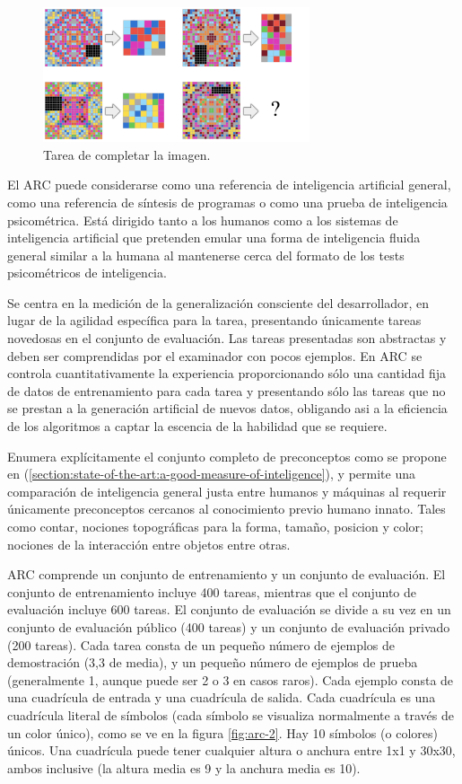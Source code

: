 \begin{figure}[ht!]
    \centering
    \includegraphics[width=0.7\textwidth]{Graphics/arc-3.png}
    \caption{Tarea de completar la imagen.}
    \label{fig:arc-3}
\end{figure}


El ARC puede considerarse como una referencia de inteligencia artificial general, como una referencia de síntesis de programas o como una prueba de inteligencia psicométrica. Está dirigido tanto a los humanos como a los sistemas de inteligencia artificial que pretenden emular una forma de inteligencia fluida general similar a la humana al mantenerse cerca del formato de los tests psicométricos de inteligencia. 

Se centra en la medición de la generalización consciente del desarrollador, en lugar de la agilidad específica para la tarea, presentando únicamente tareas novedosas en el conjunto de evaluación. Las tareas presentadas son abstractas y deben ser comprendidas por el examinador con pocos ejemplos. En ARC se controla cuantitativamente la experiencia proporcionando sólo una cantidad fija de datos de entrenamiento para cada tarea y presentando sólo las tareas que no se prestan a la generación artificial de nuevos datos, obligando asi a la eficiencia de los algoritmos a captar la escencia de la habilidad que se requiere.

Enumera explícitamente el conjunto completo de preconceptos como se propone en (\ref{section:state-of-the-art:a-good-measure-of-inteligence}), y permite una comparación de inteligencia general justa entre humanos y máquinas al requerir únicamente preconceptos cercanos al conocimiento previo humano innato. Tales como contar, nociones topográficas para la forma, tamaño, posicion y color; nociones de la interacción entre objetos entre otras.

ARC comprende un conjunto de entrenamiento y un conjunto de evaluación. El conjunto de entrenamiento incluye 400 tareas, mientras que el conjunto de evaluación incluye 600 tareas. El conjunto de evaluación se divide a su vez en un conjunto de evaluación público (400 tareas) y un conjunto de evaluación privado (200 tareas). Cada tarea consta de un pequeño número de ejemplos de demostración (3,3 de media), y un pequeño número de ejemplos de prueba (generalmente 1, aunque puede ser 2 o 3 en casos raros). Cada ejemplo consta de una cuadrícula de entrada y una cuadrícula de salida. Cada cuadrícula es una cuadrícula literal de símbolos (cada símbolo se visualiza normalmente a través de un color único), como se ve en la figura \ref{fig:arc-2}. Hay 10 símbolos (o colores) únicos. Una cuadrícula puede tener cualquier altura o anchura entre 1x1 y 30x30, ambos inclusive (la altura media es 9 y la anchura media es 10).

